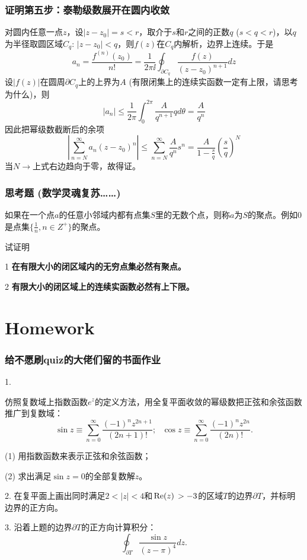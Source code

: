 \documentclass[CJK]{beamer}
\begin{document}
\begin{frame}
  \frametitle{证明第五步：泰勒级数展开在圆内收敛} 
  
 对圆内任意一点$z$，设$|z-z_0|=s<r$，取介于$s$和$r$之间的正数$q$ ($s<q<r$)，以$q$为半径取圆区域$C_q$: $|z-z_0|<q$，则$f(z)$在$C_q$内解析，边界上连续。于是
  $$ a_n = \frac{f^{(n)}(z_0)}{n!} = \frac{1}{2\pi \ii}\oint_{\partial C_q} \frac{f(z)}{(z-z_0)^{n+1}}dz $$
  设$|f(z)|$在圆周$\partial C_q$上的上界为$A$ (有限闭集上的连续实函数一定有上限，请思考为什么)，则
  $$ |a_n| \le \frac{1}{2\pi} \int_0^{2\pi} \frac{A}{q^{n+1}} qd\theta = \frac{A}{q^n} $$
  因此把幂级数截断后的余项
  $$ \left\vert \sum_{n=N}^\infty a_n (z-z_0)^n \right\vert \le \sum_{n=N}^\infty \frac{A}{q^n}s^n =\frac{A}{1-\frac{s}{q}} \left(\frac{s}{q}\right)^N$$
  当$N\rightarrow$上式右边趋向于零，故得证。
  
\end{frame}


\begin{frame}
  \frametitle{思考题 (数学灵魂复苏……)}
  
  如果在一个点$a$的任意小邻域内都有点集$S$里的无数个点，则称$a$为$S$的聚点。例如$0$是点集$\{ \frac{1}{n}, n\in Z^+\}$的聚点。


  试证明
  \bitem
\item[1]{\bf 在有限大小的闭区域内的无穷点集必然有聚点。}
\item[2]{\bf 有限大小的闭区域上的连续实函数必然有上下限。}
  \eitem
  
\end{frame}


\section{Homework}

\begin{frame}
\frametitle{给不愿刷quiz的大佬们留的书面作业}

    {\small
      
\bitem
\item[1.]{仿照复数域上指数函数$e^z$的定义方法，用全复平面收敛的幂级数把正弦和余弦函数推广到复数域：
  $$\sin z \equiv \sum_{n=0}^\infty \frac{(-1)^nz^{2n+1}}{(2n+1)!};\ \ \ \cos z \equiv \sum_{n=0}^\infty \frac{(-1)^nz^{2n}}{(2n)!}.$$
  \bitem
  \item[(1)]{ 用指数函数来表示正弦和余弦函数；}
  \item[(2)]{ 求出满足$\sin z = 0$的全部复数解$z$。}
    \eitem
    }
\item[2.]{在复平面上画出同时满足$2<|z|<4$和$\,\mathrm{Re}{\left(z\right)\,}>-3$的区域$T$的边界$\partial T$，并标明边界的正方向。} 
\item[3.]{沿着上题的边界$\partial T$的正方向计算积分：
  $$\oint_{\partial T} \frac{\sin z}{(z-\pi)^4}dz .$$
}
\eitem
 }

\end{frame}


\ech
\end{document}
